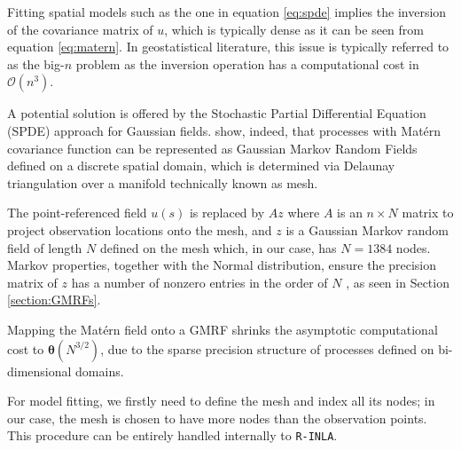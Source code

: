 \documentclass[openany, 11pt, oneside]{book}
\begin{document}
Fitting spatial models such as the one in equation \ref{eq:spde} implies the inversion of the covariance matrix of $u$, which is typically dense as it can be seen from equation \ref{eq:matern}. In geostatistical literature, this issue is typically referred to as the big-$n$ problem \parencite{bigN} as the inversion operation has a computational cost in $\mathcal{O}(n^3)$. 

A potential solution is offered by the Stochastic Partial Differential Equation (SPDE) approach for Gaussian fields. \cite{SPDE} show, indeed, that processes with Matérn covariance function can be represented as Gaussian Markov Random Fields defined on a discrete spatial domain, which is determined via Delaunay triangulation over a manifold technically known as mesh. 

The point-referenced field $u(s)$ is replaced by $A z$ where $A$ is an $n \times N$ matrix to project observation locations onto the mesh, and $z$ is a Gaussian Markov random field of length $N$ defined on the mesh which, in our case, has $N = 1384$ nodes. Markov properties, together with the Normal distribution, ensure the precision matrix of $z$ has a number of nonzero entries in the order of $N$ \parencite{GMRFs}, as seen in Section \ref{section:GMRFs}. 

Mapping the Matérn field onto a GMRF shrinks the asymptotic computational cost to $\boldsymbol{\theta}(N^{3/2})$, due to the sparse precision structure of processes defined on bi-dimensional domains.

For model fitting, we firstly need to define the mesh and index all its nodes; in our case, the mesh is chosen to have more nodes than the observation points. This procedure can be entirely handled internally to \texttt{R-INLA}.

\end{document}
